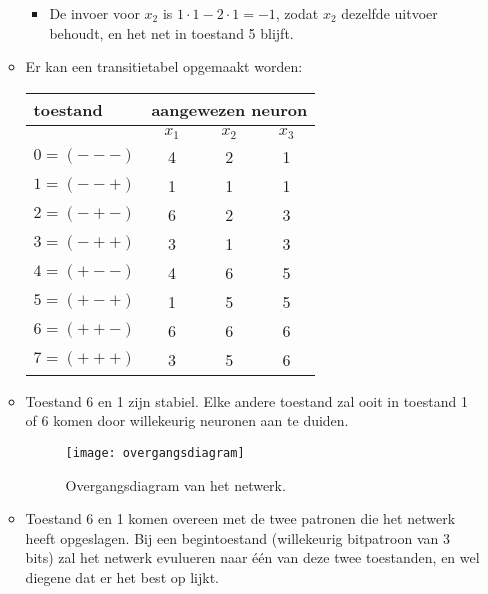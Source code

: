 \begin{itemize}
\begin{itemize}
\begin{itemize}
            \item De invoer voor $x_2$ is $1 \cdot 1 - 2 \cdot 1 = -1$, zodat $x_2$ dezelfde uitvoer behoudt, en het net in toestand 5 blijft.
        \end{itemize}
        \item Er kan een transitietabel opgemaakt worden:
        \begin{table}[ht]
            \centering
            \begin{tabular}{| l | c  c  c |}
                \hline
                toestand & \multicolumn{3}{c|}{aangewezen neuron} \\
                \hline
                & $x_1$ & $x_2$ & $x_3$ \\
                \hline
                $0=(---)$ & 4 & 2 & 1 \\
                $1=(--+)$ & 1 & 1 & 1 \\
                $2=(-+-)$ & 6 & 2 & 3 \\
                $3=(-++)$ & 3 & 1 & 3 \\
                $4=(+--)$ & 4 & 6 & 5 \\
                $5=(+-+)$ & 1 & 5 & 5 \\
                $6=(++-)$ & 6 & 6 & 6 \\
                $7=(+++)$ & 3 & 5 & 6 \\
                \hline
            \end{tabular}
        \end{table}
        \item Toestand 6 en 1 zijn stabiel. Elke andere toestand zal ooit in toestand 1 of 6 komen door willekeurig neuronen aan te duiden.
        \begin{figure}[ht]
            \centering
            \texttt{[image: overgangsdiagram]}
            \caption{Overgangsdiagram van het netwerk.}
            \label{}
        \end{figure}
        \item Toestand 6 en 1 komen overeen met de twee patronen die het netwerk heeft opgeslagen. Bij een begintoestand (willekeurig bitpatroon van 3 bits) zal het netwerk evulueren naar één van deze twee toestanden, en wel diegene dat er het best op lijkt.
    \end{itemize}
\end{itemize}
